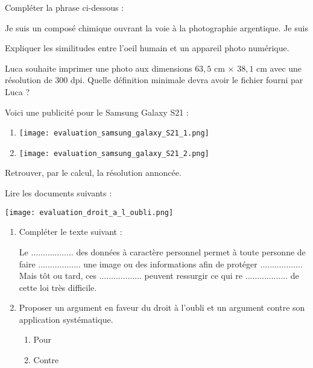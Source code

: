 \documentclass[a4paper]{article}
\begin{document}
\bigskip

\exo[1 point] Compléter la phrase ci-dessous :

\begin{center}
  \og{}Je suis un composé chimique ouvrant la voie à la photographie argentique. Je suis \dotfill\fg{}
\end{center}

\bigskip

\exo[3 points] Expliquer les similitudes entre l'oeil humain et un appareil photo numérique.

\bigskip

\exo[3 points] Luca souhaite imprimer une photo aux dimensions $63,5$ cm $\times$ $38,1$ cm avec une résolution de $300$ dpi. Quelle définition minimale devra avoir le fichier fourni par Luca ?

\pagebreak

\exo[3 points] Voici une publicité pour le Samsung Galaxy S21 :

\medskip

\begin{multicols}{2}
  \begin{enumerate}
    \item [] \texttt{[image: evaluation\_samsung\_galaxy\_S21\_1.png]}
    \item [] \texttt{[image: evaluation\_samsung\_galaxy\_S21\_2.png]}
  \end{enumerate}
  Retrouver, par le calcul, la résolution annoncée.
\end{multicols}

\medskip


\bigskip

\exo[3 points] Lire les documents suivants :

\begin{center}
  \texttt{[image: evaluation\_droit\_a\_l\_oubli.png]}
\end{center}

\begin{enumerate}
  \item Compléter le texte suivant :

    \medskip

    Le $\hdots\hdots\hdots\hdots\hdots\hdots$ des données à caractère personnel permet à toute personne de faire $\hdots\hdots\hdots\hdots\hdots\hdots$ une image ou des informations afin de protéger $\hdots\hdots\hdots\hdots\hdots\hdots$ Mais tôt ou tard, ces $\hdots\hdots\hdots\hdots\hdots\hdots$ peuvent ressurgir ce qui re $\hdots\hdots\hdots\hdots\hdots\hdots$ de cette loi très difficile.
  \item Proposer un argument en faveur du droit à l'oubli et un argument contre son application systématique.
    \begin{multicols}{2}
      \begin{enumerate}
	\item Pour
	\item Contre
      \end{enumerate} 
    \end{multicols}
\end{enumerate}
\end{document}
